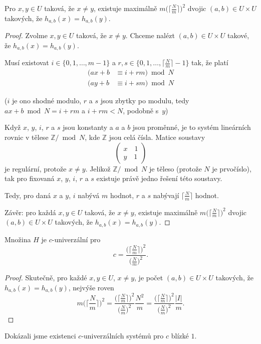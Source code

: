 \documentclass[a4paper,12pt]{article}
\begin{document}
\begin{lemma}
    Pro $x,y\in U$ taková, že $x\ne y$, existuje maximálně $m\big(\lceil\frac Nm\rceil\big)^2$ dvojic $(a
    ,b)\in U\times U$ takových, že 
    $h_{a,b}(x)=h_{a,b}(y)$.
\end{lemma}
\begin{proof}
Zvolme $x,y\in U$ taková, že $x\ne y$. Chceme nalézt 
$(a,b)\in U\times U$ takové, že $h_{a,b}(x)=h_{a,b}(y)$. 

Musí existovat $i\in \{0,1,\dots,m-1\}$ a 
$r,s\in \{0,1,\dots,\lceil\frac Nm\rceil -1\}$ tak, že platí
\begin{align*}(ax+b&\equiv i+rm)\bmod N\\
(ay+b&\equiv i+sm)\bmod N\end{align*}

($i$ je ono shodné modulo, $r$ a $s$ jsou zbytky po modulu, tedy $ax+b\bmod N=i+rm$ a $i+rm<N$, podobně s~$y$)

Když $x$, $y$, $i$, $r$ a $s$ jsou konstanty a $a$ a $b$ jsou 
proměnné, je to systém lineárních rovnic v tělese 
$\mathbb Z/\bmod N$, kde $\mathbb Z$ jsou celá čísla. Matice soustavy  
$$\begin{pmatrix} x\quad 1\\
y\quad 1\end{pmatrix} $$
je regulární, protože $x\ne y$. Jelikož $\mathbb Z/\bmod N$ je těleso (protože $N$ je prvočíslo), tak 
 pro fixovaná $x$, $y$, $i$, $r$ a $s$ existuje právě jedno řešení této soustavy.


Tedy, pro daná $x$ a $y$, $i$ nabývá $m$ hodnot, $r$ a $s$ nabývají 
$\lceil\frac Nm\rceil$ hodnot. 

Závěr: pro každá $x,y\in U$ taková, že 
$x\ne y$, existuje maximálně $m\big(\lceil\frac Nm\rceil\big)^2$ dvojic $(a
,b)\in U\times U$ takových, že 
$h_{a,b}(x)=h_{a,b}(y)$.
\end{proof}

\begin{veta}Množina $H$ je $c$-univerzální pro 
$$c=\frac {\big(\lceil\frac Nm\rceil\big)^2}{\big(\frac Nm\big)^2}
.$$
\end{veta}
\begin{proof}
Skutečně, pro každé $x,y\in U$, $x\ne y$, je počet 
$(a,b)\in U\times U$ takových, že $h_{a,b}(x)=h_{a,b}(y)$, nejvýše roven
$$m\big(\lceil\frac Nm\rceil\big)^2=\frac {\big(\lceil\frac Nm\rceil\big
)^2}{\big(\frac Nm\big)^2}\frac {N^2}m=\frac {\big(\lceil\frac Nm
\rceil\big)^2}{\big(\frac Nm\big)^2}\frac {|I|}m.$$
\end{proof}
\begin{pozorovani}
Dokázali jsme existenci $c$-univerzálních 
systémů pro $c$ blízké $1$. 
\end{pozorovani}
\end{document}
